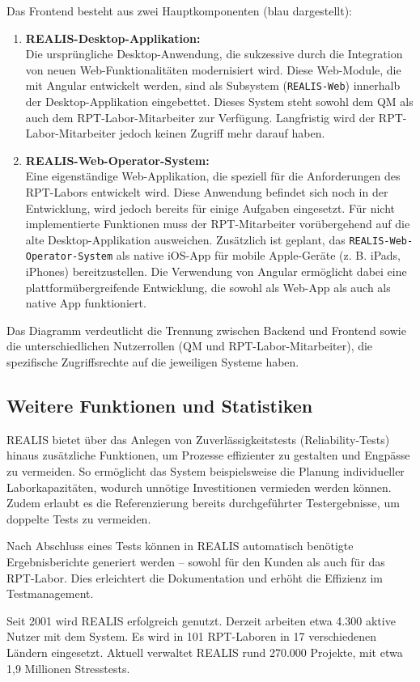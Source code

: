 Das Frontend besteht aus zwei Hauptkomponenten (blau dargestellt):
\begin{enumerate}
    \item \textbf{REALIS-Desktop-Applikation:} \\
Die ursprüngliche Desktop-Anwendung, die sukzessive durch die Integration von neuen Web-Funktionalitäten modernisiert wird. Diese Web-Module, die mit Angular entwickelt werden, sind als Subsystem (\texttt{REALIS-Web}) innerhalb der Desktop-Applikation eingebettet. Dieses System steht sowohl dem \ac{QM} als auch dem \ac{RPT}-Labor-Mitarbeiter zur Verfügung. Langfristig wird der \ac{RPT}-Labor-Mitarbeiter jedoch keinen Zugriff mehr darauf haben.

\item \textbf{REALIS-Web-Operator-System:} \\
Eine eigenständige Web-Applikation, die speziell für die Anforderungen des \ac{RPT}-Labors entwickelt wird. Diese Anwendung befindet sich noch in der Entwicklung, wird jedoch bereits für einige Aufgaben eingesetzt. Für nicht implementierte Funktionen muss der \ac{RPT}-Mitarbeiter vorübergehend auf die alte Desktop-Applikation ausweichen. Zusätzlich ist geplant, das \texttt{REALIS-Web-Operator-System} als native iOS-App für mobile Apple-Geräte (z. B. iPads, iPhones) bereitzustellen. Die Verwendung von Angular ermöglicht dabei eine plattformübergreifende Entwicklung, die sowohl als Web-App als auch als native App funktioniert.
\end{enumerate}

Das Diagramm verdeutlicht die Trennung zwischen Backend und Frontend sowie die unterschiedlichen Nutzerrollen (\ac{QM} und \ac{RPT}-Labor-Mitarbeiter), die spezifische Zugriffsrechte auf die jeweiligen Systeme haben.


\subsection{Weitere Funktionen und Statistiken}
\ac{REALIS} bietet über das Anlegen von Zuverlässigkeitstests (Reliability-Tests) hinaus zusätzliche Funktionen, um Prozesse effizienter zu gestalten und Engpässe zu vermeiden. So ermöglicht das System beispielsweise die Planung individueller Laborkapazitäten, wodurch unnötige Investitionen vermieden werden können. Zudem erlaubt es die Referenzierung bereits durchgeführter Testergebnisse, um doppelte Tests zu vermeiden.

Nach Abschluss eines Tests können in \ac{REALIS} automatisch benötigte Ergebnisberichte generiert werden – sowohl für den Kunden als auch für das \ac{RPT}-Labor. Dies erleichtert die Dokumentation und erhöht die Effizienz im Testmanagement.

Seit 2001 wird \ac{REALIS} erfolgreich genutzt. Derzeit arbeiten etwa 4.300 aktive Nutzer mit dem System. Es wird in 101 \ac{RPT}-Laboren in 17 verschiedenen Ländern eingesetzt. Aktuell verwaltet \ac{REALIS} rund 270.000 Projekte, mit etwa 1,9 Millionen Stresstests.